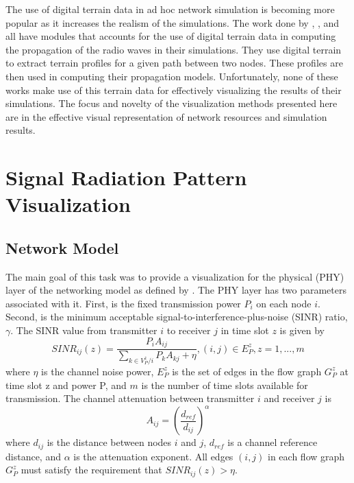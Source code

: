 The use of digital terrain data in ad hoc network simulation is becoming more popular as it increases the realism of the simulations.  The work done by \cite{LuiPerNic01}, \cite{BonWanSta98}, and \cite{DzaTraFil07} all have modules that accounts for the use of digital terrain data in computing the propagation of the radio waves in their simulations.  They use digital terrain to extract terrain profiles for a given path between two nodes.  These profiles are then used in computing their propagation models.  Unfortunately, none of these works make use of this terrain data for effectively visualizing the results of their simulations.  The focus and novelty of the visualization methods presented here are in the effective visual representation of network resources and simulation results.


\section{Signal Radiation Pattern Visualization}
\subsection{Network Model}
The main goal of this task was to provide a visualization for the physical (PHY) layer of the networking model as defined by \cite{WuChoQia05}.  The PHY layer has two parameters associated with it.  First, is the fixed transmission power $P_i$ on each node $i$.  Second, is the minimum acceptable signal-to-interference-plus-noise (SINR) ratio, $\gamma$.  The SINR value from transmitter $i$ to receiver $j$ in time slot $z$ is given by \begin{equation}
SINR_{ij}(z) = \frac{P_i A_{ij}}{\sum_{k \in V_P^z / i} P_k A_{k j} + \eta } , (i, j) \in E_P^z , z = 1,...,m
\end{equation} where $\eta$ is the channel noise power, $E_P^z$ is the set of edges in the flow graph $G_P^z$ at time slot z and power P, and $m$ is the number of time slots available for transmission.  The channel attenuation between transmitter $i$ and receiver $j$ is \begin{equation}
A_{ij} = (\frac{d_{ref}}{d_{ij}})^\alpha
\end{equation} where $d_{ij}$ is the distance between nodes $i$ and $j$, $d_{ref}$ is a channel reference distance, and $\alpha$ is the attenuation exponent.  All edges $(i,j)$ in each flow graph $G_P^z$ must satisfy the requirement that \begin{math}SINR_{ij}(z) > \eta \end{math}.

